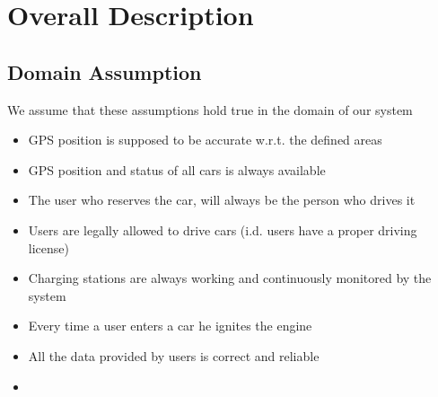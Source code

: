 \section{Overall Description}
\subsection{Domain Assumption}
	We assume that these assumptions hold true in the domain of our system 
	\begin{itemize}
		\item GPS position is supposed to be accurate w.r.t. the defined areas
		\item GPS position and status of all cars is always available
		\item The user who reserves the car, will always be the person who drives it
		\item Users are legally allowed to drive cars (i.d. users have a proper driving license)
		\item Charging stations are always working and continuously monitored by the system
		\item Every time a user enters a car he ignites the engine
		\item All the data provided by users is correct and reliable
		\item 
	\end{itemize}